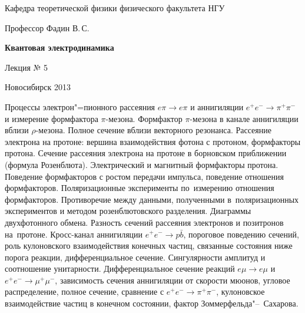 \documentclass[12pt,pagesize,paper=192mm:108mm]{scrbook}
\begin{document}
\begin{titlepage}
\begin{center}
    Кафедра теоретической физики физического факультета НГУ
    \medskip

    \Large
    Профессор Фадин В.\,С.
    \bigskip

    \huge
    \textbf{Квантовая электродинамика}
    \bigskip

    \Large
    Лекция № 5
    \vfill

    \normalsize
    \vfill

    \normalsize \ccbysa\hspace{0.5em}  Новосибирск 2013
  \end{center}
\end{titlepage}
\vspace*{-1em}
\begin{center}
\vfill
  \begin{minipage}{0.85\linewidth}
    Процессы электрон"=пионного рассеяния $e \pi \to e \pi$ и
    аннигиляции $e^+e^-\to\pi^+\pi^-$ и измерение формфактора
    $\pi$-мезона. Формфактор $\pi$-мезона в канале аннигиляции вблизи
    $\rho$-мезона. Полное сечение вблизи векторного резонанса.
    Рассеяние электрона на протоне: вершина взаимодействия фотона с
    протоном, формфакторы протона. Сечение рассеяния электрона на
    протоне в борновском приближении (формула
    Розенблюта). Электрический и магнитный формфакторы
    протона. Поведение формфакторов с ростом передачи импульса,
    поведение отношения формфакторов. Поляризационные эксперименты
    по~измерению отношения формфакторов. Противоречие между данными,
    полученными в~поляризационных экспериментов и методом
    розенблютовского разделения.  Диаграммы двухфотонного
    обмена. Разность сечений рассеяния электронов и позитронов
    на~протоне. Кросс-канал аннигиляции $e^+e^- \to p\bar{b}$,
    пороговое поведению сечений, роль кулоновского взаимодействия
    конечных частиц, связанные состояния ниже порога реакции,
    дифференциальное сечение. Сингулярности амплитуд и соотношение
    унитарности.  Дифференциальное сечение реакций $e\mu \to e\mu$ и
    $e^+e^- \to \mu^+\mu^-$, зависимость сечения аннигиляции от
    скорости мюонов, угловое распределение, полное сечение, сравнение
    с $e^+e^- \to \pi^+\pi^-$, кулоновское взаимодействие частиц в
    конечном состоянии, фактор Зоммерфельда"--~Сахарова.
  \end{minipage}
  \vfill

\end{center}
\end{document}

